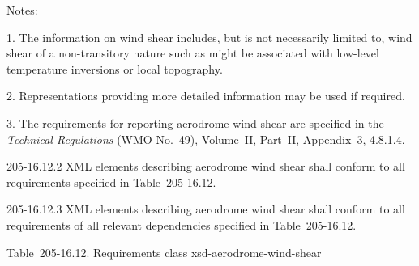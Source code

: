 Notes:

1. The information on wind shear includes, but is not necessarily limited to, wind shear of a non-transitory nature such as might be associated with low-level temperature inversions or local topography.

2. Representations providing more detailed information may be used if required.

3. The requirements for reporting aerodrome wind shear are specified in the \emph{Technical Regulations} (WMO-No.~49), Volume~II, Part~II, Appendix~3, 4.8.1.4.

205-16.12.2 XML elements describing aerodrome wind shear shall conform to all requirements specified in Table~205-16.12.

205-16.12.3 XML elements describing aerodrome wind shear shall conform to all requirements of all relevant dependencies specified in Table~205-16.12.

Table~205-16.12. Requirements class xsd-aerodrome-wind-shear

